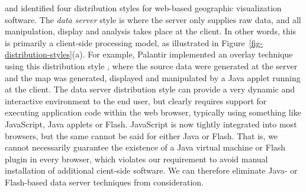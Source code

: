 \documentclass[acmtocl,acmnow]{acmtrans2m}
\begin{document}
 and  identified four
distribution styles for web-based geographic visualization software. The
\emph{data server} style is where the server only supplies raw data, and
all manipulation, display and analysis takes place at the client. In
other words, this is primarily a client-side processing model, as
illustrated in Figure~\ref{fig-distribution-styles}(a). For example, Palantir
implemented an overlay technique using this distribution style
\cite{Papa-N-1998-Palantir}, where the source data were generated at the
server and the map was generated, displayed and manipulated by a Java
applet running at the client. The data server distribution style can
provide a very dynamic and interactive environment to the end user, but
clearly requires support for executing application code within the web
browser, typically using something like JavaScript, Java applets or
Flash. JavaScript is now tightly integrated into most browsers, but the
same cannot be said for either Java or Flash. That is, we cannot
necessarily guarantee the existence of a Java virtual machine or Flash
plugin in every browser, which violates our requirement to avoid manual
installation of additional cient-side software. We can therefore
eliminate Java- or Flash-based data server techniques from
consideration.
\end{document}
